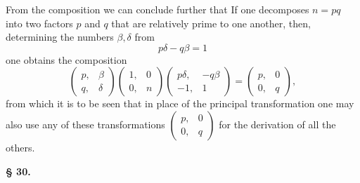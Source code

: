 From the composition
we can conclude further that  If one decomposes $n = pq$ into two factors
 $p$ and $q$ that are relatively prime to one another, then,
determining the numbers $\beta, \delta$ from
\[
p\delta - q\beta = 1
\]
one obtains the composition
\[
\begin{pmatrix}p, & \beta\\q, & \delta\end{pmatrix}\begin{pmatrix}1, & 0\\0, & n\end{pmatrix}\begin{pmatrix}p\delta, & -q\beta\\-1, & 1\end{pmatrix} = \begin{pmatrix}p, & 0\\0, & q\end{pmatrix},
\]
from which it is to be seen that in place of the principal transformation
one may also use any of these transformations $\begin{pmatrix}p, & 0\\0, & q\end{pmatrix}$ for the derivation of all
the others.

\begin{center}
\textbf{§ 30. }
\end{center}

